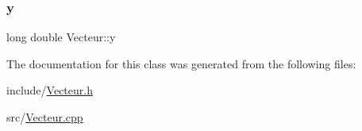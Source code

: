 \mbox{\label{classVecteur_ab68457b2f57879f056bb8c354338f5b9}} 
\subsubsection{\texorpdfstring{y}{y}}
{\footnotesize\ttfamily long double Vecteur\+::y}



The documentation for this class was generated from the following files\+:\begin{DoxyCompactItemize}
\item 
include/\mbox{\hyperlink{Vecteur_8h}{Vecteur.\+h}}\item 
src/\mbox{\hyperlink{Vecteur_8cpp}{Vecteur.\+cpp}}\end{DoxyCompactItemize}
